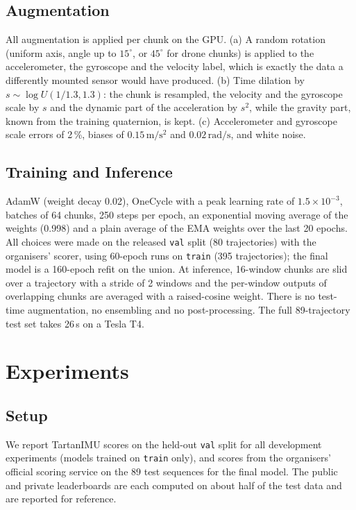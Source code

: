 \documentclass[letterpaper,10pt,conference]{ieeeconf}
\begin{document}
\subsection{Augmentation}
All augmentation is applied per chunk on the GPU. (a) A random rotation (uniform axis, angle up to $15^\circ$, or
$45^\circ$ for drone chunks) is applied to the accelerometer, the gyroscope and the velocity label, which is exactly
the data a differently mounted sensor would have produced. (b) Time dilation by $s \sim \log U(1/1.3, 1.3)$: the
chunk is resampled, the velocity and the gyroscope scale by $s$ and the dynamic part of the acceleration by $s^2$,
while the gravity part, known from the training quaternion, is kept. (c) Accelerometer and gyroscope scale errors of
2\,\%, biases of $0.15\,\mathrm{m/s^2}$ and $0.02\,\mathrm{rad/s}$, and white noise.

\subsection{Training and Inference}
AdamW (weight decay 0.02), OneCycle with a peak learning rate of $1.5 \times 10^{-3}$, batches of 64 chunks, 250
steps per epoch, an exponential moving average of the weights (0.998) and a plain average of the EMA weights over the
last 20 epochs. All choices were made on the released \texttt{val} split (80 trajectories) with the organisers'
scorer, using 60-epoch runs on \texttt{train} (395 trajectories); the final model is a 160-epoch refit on the union.
At inference, 16-window chunks are slid over a trajectory with a stride of 2 windows and the per-window outputs of
overlapping chunks are averaged with a raised-cosine weight. There is no test-time augmentation, no ensembling and
no post-processing. The full 89-trajectory test set takes 26\,s on a Tesla T4.

\section{Experiments}
\subsection{Setup}
We report TartanIMU scores on the held-out \texttt{val} split for all development experiments (models trained on
\texttt{train} only), and scores from the organisers' official scoring service on the 89 test sequences for the
final model. The public and private leaderboards are each computed on about half of the test data and are reported for
reference.
\end{document}
